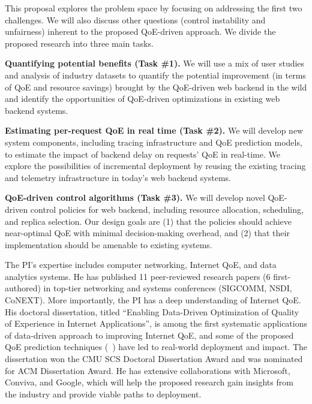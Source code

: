 This proposal explores the problem space by focusing on addressing the first two challenges. We will also discuss other questions (\eg control instability and unfairness) inherent to the proposed QoE-driven approach.
We divide the proposed research into three main tasks. 

\begin{packeditemize}
\item{\bf Quantifying potential benefits (Task \#1).}
We will use a mix of user studies and analysis of industry datasets to quantify the potential improvement (in terms of QoE and resource savings) brought by the QoE-driven web backend in the wild and identify the opportunities of QoE-driven optimizations in existing web backend systems.%

\item{\bf Estimating per-request QoE in real time (Task \#2).}
We will develop new system components, including tracing infrastructure and QoE prediction models, to estimate the impact of backend delay on requests' QoE in real-time. We explore the possibilities of incremental deployment by reusing the existing tracing and telemetry infrastructure in today's web backend systems.

\item{\bf QoE-driven control algorithms (Task \#3).}
We will develop novel QoE-driven control policies for web backend, including resource allocation, scheduling, and replica selection. Our design goals are (1) that the policies should achieve near-optimal QoE with minimal decision-making overhead, and (2) that their implementation should be amenable to existing systems.

\end{packeditemize}


The PI's expertise includes computer networking, Internet QoE, and data analytics systems.
He has published 11 peer-reviewed research papers (6 first-authored) in top-tier networking and systems conferences (\ie SIGCOMM, NSDI, CoNEXT).
More importantly, the PI has a deep understanding of Internet QoE. His doctoral dissertation, titled ``Enabling Data-Driven Optimization of Quality of Experience in Internet Applications'', is among the first systematic applications of data-driven approach to improving Internet QoE, and some of the proposed QoE prediction techniques (\eg~\cite{cfa,c3}) have led to real-world deployment and impact. The dissertation won the CMU SCS Doctoral Dissertation Award and was nominated for ACM Dissertation Award.
He has extensive collaborations with Microsoft, Conviva, and Google, which will help the proposed research gain insights from the industry and provide viable paths to deployment.



